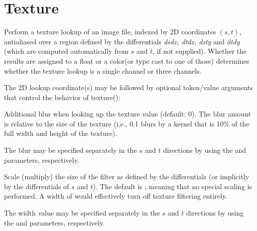 \documentclass[11pt,letterpaper]{book}
\def\color{{\cf color}\xspace}
\def\float{{\cf float}\xspace}
\begin{document}


\section{Texture}
\label{sec:stdlib:texture}


Perform a texture lookup of an image file, indexed by 2D coordinates
$(s,t)$, antialiased over a region defined by the differentials
\emph{dsdx, dtdx, dsty} and \emph{dtdy} (which are computed
automatically from $s$ and $t$, if not supplied).  Whether the results
are assigned to a \float or a \color (or type cast to one of those)
determines whether the texture lookup is a single channel or three
channels.

The 2D lookup coordinate(s) may be followed by optional token/value
arguments that control the behavior of {\cf texture()}:

\vspace{12pt}
Additional blur when looking up the texture value (default: 0).  The
blur amount is relative to the size of the texture (i.e., 0.1 blurs by a
kernel that is 10\% of the full width and height of the texture).

The blur may be specified separately in the $s$ and $t$ directions by
using the  and  parameters, respectively.
\apiend
\vspace{-16pt}

\vspace{12pt}
Scale (multiply) the size of the filter as defined by the differentials
(or implicitly by the differentials of $s$ and $t$).  The default is
{}, meaning that no special scaling is performed.  A width of
{} would effectively turn off texture filtering entirely.

The width value may be specified separately in the $s$ and $t$
directions by using the  and  parameters,
respectively.
\apiend
\vspace{-16pt}
\end{document}
